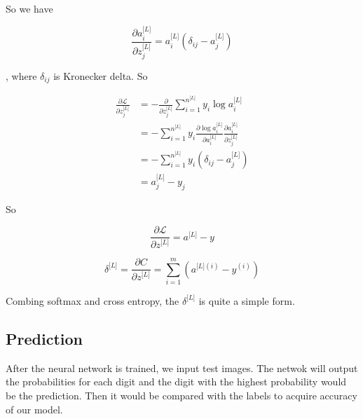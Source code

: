\documentclass[11pt]{scrartcl} %
\begin{document}
So we have 

\begin{equation}
\frac{\partial a_i^{\lbrack L\rbrack}}{\partial z_j^{\lbrack L\rbrack}}=a_i^{\lbrack L\rbrack}(\delta_{ij}-a_j^{\lbrack L\rbrack})
\end{equation}

, where $\delta_{ij}$ is Kronecker delta. So

\begin{equation}
\begin{split}
\frac{\partial\mathcal L}{\partial z_j^{\lbrack L\rbrack}}&=-\frac\partial{\partial z_j^{\lbrack L\rbrack}}\sum_{i=1}^{n^{\lbrack L\rbrack}}y_i\log a_i^{\lbrack L\rbrack} \\
&=-\sum_{i=1}^{n^{\lbrack L\rbrack}}y_i\frac{\partial{\log a_i^{\lbrack L\rbrack}}}{\partial {a_i^{\lbrack L\rbrack}}}\frac{\partial {a_i^{\lbrack L\rbrack}}}{\partial {z_j^{\lbrack L\rbrack}}} \\
&=-\sum_{i=1}^{n^{\lbrack L\rbrack}}y_i(\delta_{ij}-a_j^{\lbrack L\rbrack}) \\
&=a_j^{\lbrack L\rbrack}-y_j
\end{split}
\end{equation}

So 

\begin{equation}
\frac{\partial\mathcal L}{\partial z^{\lbrack L\rbrack}}=a^{\lbrack L\rbrack}-y
\end{equation}

\begin{equation}
\delta^{\lbrack L\rbrack}=\frac{\partial C}{\partial z^{\lbrack L\rbrack}}=\sum_{i=1}^{m}(a^{\lbrack L\rbrack (i)}-y^{(i)})
\end{equation}

Combing softmax and cross entropy, the $\delta^{\lbrack L\rbrack}$ is quite a simple form.

\subsection{Prediction}
After the neural network is trained, we input test images. The netwok will output the probabilities for each digit and the digit with the highest probability would be the prediction. Then it would be compared with the labels to acquire accuracy of our model.

\end{document}
